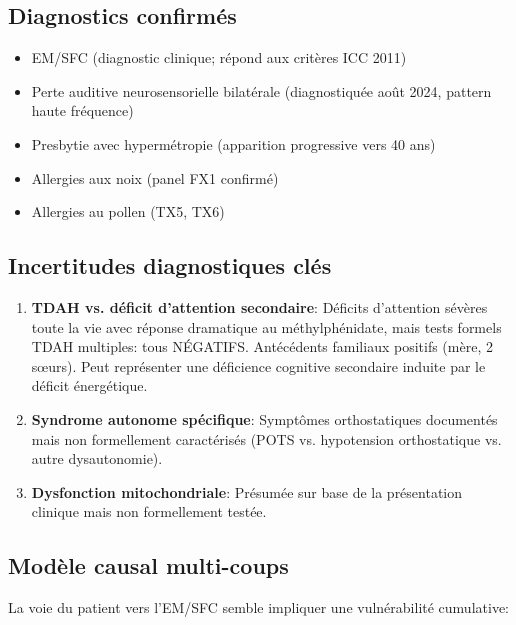 \subsection{Diagnostics confirmés}

\begin{itemize}
\item EM/SFC (diagnostic clinique; répond aux critères ICC 2011)
\item Perte auditive neurosensorielle bilatérale (diagnostiquée août 2024, pattern haute fréquence)
\item Presbytie avec hypermétropie (apparition progressive vers 40 ans)
\item Allergies aux noix (panel FX1 confirmé)
\item Allergies au pollen (TX5, TX6)
\end{itemize}

\subsection{Incertitudes diagnostiques clés}

\begin{enumerate}
\item \textbf{TDAH vs. déficit d'attention secondaire}: Déficits d'attention sévères toute la vie avec réponse dramatique au méthylphénidate, mais tests formels TDAH multiples: tous NÉGATIFS. Antécédents familiaux positifs (mère, 2 sœurs). Peut représenter une déficience cognitive secondaire induite par le déficit énergétique.

\item \textbf{Syndrome autonome spécifique}: Symptômes orthostatiques documentés mais non formellement caractérisés (POTS vs. hypotension orthostatique vs. autre dysautonomie).

\item \textbf{Dysfonction mitochondriale}: Présumée sur base de la présentation clinique mais non formellement testée.
\end{enumerate}

\subsection{Modèle causal multi-coups}

La voie du patient vers l'EM/SFC semble impliquer une vulnérabilité cumulative:

